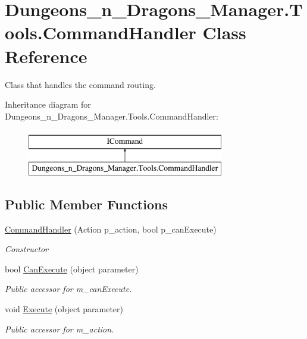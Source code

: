\hypertarget{class_dungeons__n___dragons___manager_1_1_tools_1_1_command_handler}{}\section{Dungeons\+\_\+n\+\_\+\+Dragons\+\_\+\+Manager.\+Tools.\+Command\+Handler Class Reference}
\label{class_dungeons__n___dragons___manager_1_1_tools_1_1_command_handler}


Class that handles the command routing.  


Inheritance diagram for Dungeons\+\_\+n\+\_\+\+Dragons\+\_\+\+Manager.\+Tools.\+Command\+Handler\+:\begin{figure}[H]
\begin{center}
\leavevmode
\includegraphics[height=2.000000cm]{class_dungeons__n___dragons___manager_1_1_tools_1_1_command_handler}
\end{center}
\end{figure}
\subsection*{Public Member Functions}
\begin{DoxyCompactItemize}
\item 
\mbox{\hyperlink{class_dungeons__n___dragons___manager_1_1_tools_1_1_command_handler_abfd4f02a15a64024be13cc4c6b8d5f31}{Command\+Handler}} (Action p\+\_\+action, bool p\+\_\+can\+Execute)
\begin{DoxyCompactList}\small\item\em Constructor \end{DoxyCompactList}\item 
bool \mbox{\hyperlink{class_dungeons__n___dragons___manager_1_1_tools_1_1_command_handler_a6ba70de2094840d5e54f317df754ead4}{Can\+Execute}} (object parameter)
\begin{DoxyCompactList}\small\item\em Public accessor for m\+\_\+can\+Execute. \end{DoxyCompactList}\item 
void \mbox{\hyperlink{class_dungeons__n___dragons___manager_1_1_tools_1_1_command_handler_a0b190a9cd8646d848b601e080f607a30}{Execute}} (object parameter)
\begin{DoxyCompactList}\small\item\em Public accessor for m\+\_\+action. \end{DoxyCompactList}\end{DoxyCompactItemize}
